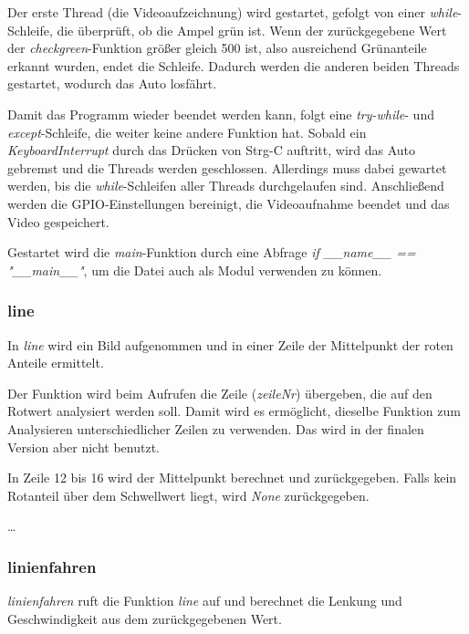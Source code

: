 \documentclass[a4paper, 12pt]{scrartcl}
\begin{document}
Der erste Thread (die Videoaufzeichnung) wird gestartet, gefolgt von einer \textit{while}-Schleife, die überprüft, ob die Ampel grün ist. Wenn der zurückgegebene Wert der \textit{checkgreen}-Funktion größer gleich 500 ist, also ausreichend Grünanteile erkannt wurden, endet die Schleife. Dadurch werden die anderen beiden Threads gestartet, wodurch das Auto losfährt.

Damit das Programm wieder beendet werden kann, folgt eine \textit{try-while}- und \textit{except}-Schleife, die weiter keine andere Funktion hat. Sobald ein \textit{KeyboardInterrupt} durch das Drücken von Strg-C auftritt, wird das Auto gebremst und die Threads werden geschlossen. Allerdings muss dabei gewartet werden, bis die \textit{while}-Schleifen aller Threads durchgelaufen sind. Anschließend werden die GPIO-Einstellungen bereinigt, die Videoaufnahme beendet und das Video gespeichert.

Gestartet wird die \textit{main}-Funktion durch eine Abfrage \textit{if \_\_name\_\_ == "\_\_main\_\_"}, um die Datei auch als Modul verwenden zu können.

\subsubsection{line}


In \textit{line} wird ein Bild aufgenommen und in einer Zeile der Mittelpunkt der roten Anteile ermittelt.

Der Funktion wird beim Aufrufen die Zeile (\textit{zeileNr}) übergeben, die auf den Rotwert analysiert werden soll. Damit wird es ermöglicht, dieselbe Funktion zum Analysieren unterschiedlicher Zeilen zu verwenden. Das wird in der finalen Version aber nicht benutzt.

In Zeile 12 bis 16 wird der Mittelpunkt berechnet und zurückgegeben. Falls kein Rotanteil über dem Schwellwert liegt, wird \textit{None} zurückgegeben.

\ldots

\subsubsection{linienfahren}


\textit{linienfahren} ruft die Funktion \textit{line} auf und berechnet die Lenkung und Geschwindigkeit aus dem zurückgegebenen Wert.
\end{document}
